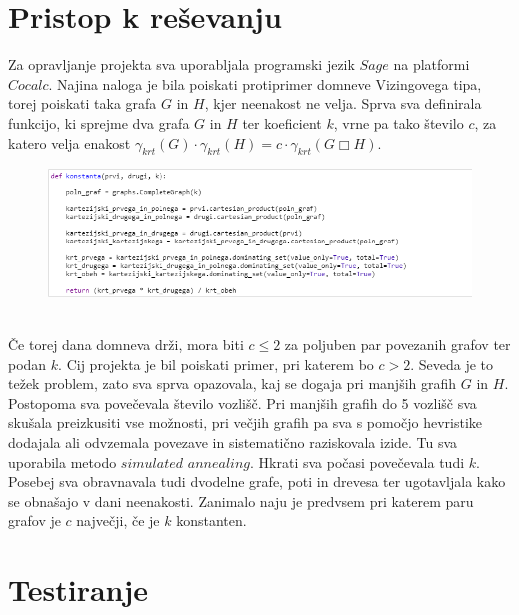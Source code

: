 \documentclass[12pt, a4paper]{article}
\begin{document}
\section{Pristop k reševanju}
Za opravljanje projekta sva uporabljala programski jezik $Sage$ na platformi $Cocalc$. Najina naloga je bila poiskati protiprimer domneve Vizingovega tipa, torej poiskati taka grafa $G$ in $H$, kjer neenakost ne velja. Sprva sva definirala funkcijo, ki sprejme dva grafa $G$ in $H$ ter koeficient $k$, vrne pa tako število $c$, za katero velja enakost $\gamma_{krt}(G) \cdot \gamma_{krt}(H) = c \cdot \gamma_{krt}(G \Box H)$. 
\begin{figure}[h!]
\centering
\includegraphics[width=\linewidth]{slika_1}
\end{figure} \\
Če torej dana domneva drži, mora biti $c \leq 2$ za poljuben par povezanih grafov ter podan $k$. Cij projekta je bil poiskati primer, pri katerem bo $c>2$. Seveda je to težek problem, zato sva sprva opazovala, kaj se dogaja pri manjših grafih $G$ in $H$. Postopoma sva povečevala število vozlišč. Pri manjših grafih do 5 vozlišč sva skušala preizkusiti vse možnosti, pri večjih grafih pa sva s pomočjo hevristike dodajala ali odvzemala povezave in sistematično raziskovala izide. Tu sva uporabila metodo $simulated$ $annealing$. Hkrati sva počasi povečevala tudi $k$. Posebej sva obravnavala tudi dvodelne grafe, poti in drevesa ter ugotavljala kako se obnašajo v dani neenakosti. Zanimalo naju je predvsem pri katerem paru grafov je $c$ največji, če je $k$ konstanten.

\section{Testiranje}
\end{document}
